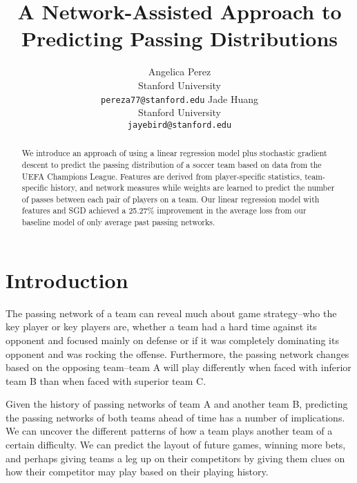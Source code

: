 \documentclass[11pt,letterpaper]{article}
\title{A Network-Assisted Approach to Predicting Passing Distributions}
\author{Angelica Perez\\
	Stanford University \\
  {\tt pereza77@stanford.edu}
  \And
  Jade Huang\\
  Stanford University \\
  {\tt jayebird@stanford.edu}}
\date{}
\begin{document}
\maketitle
\begin{abstract}
We introduce an approach of using a linear regression model plus stochastic gradient descent to predict the passing distribution of a soccer team based on data from the UEFA Champions League. Features are derived from player-specific statistics, team-specific history, and network measures while weights are learned to predict the number of passes between each pair of players on a team. Our linear regression model with features and SGD achieved a 25.27\% improvement in the average loss from our baseline model of only average past passing networks.
\end{abstract}

\section{Introduction}
The passing network of a team can reveal much about game strategy--who the key player or key players are, whether a team had a hard time against its opponent and focused mainly on defense or if it was completely dominating its opponent and was rocking the offense. Furthermore, the passing network changes based on the opposing team--team A will play differently when faced with inferior team B than when faced with superior team C. 

Given the history of passing networks of team A and another team B, predicting the passing networks of both teams ahead of time has a number of implications. We can uncover the different patterns of how a team plays another team of a certain difficulty. We can predict the layout of future games, winning more bets, and perhaps giving teams a leg up on their competitors by giving them clues on how their competitor may play based on their playing history.


\end{document}
